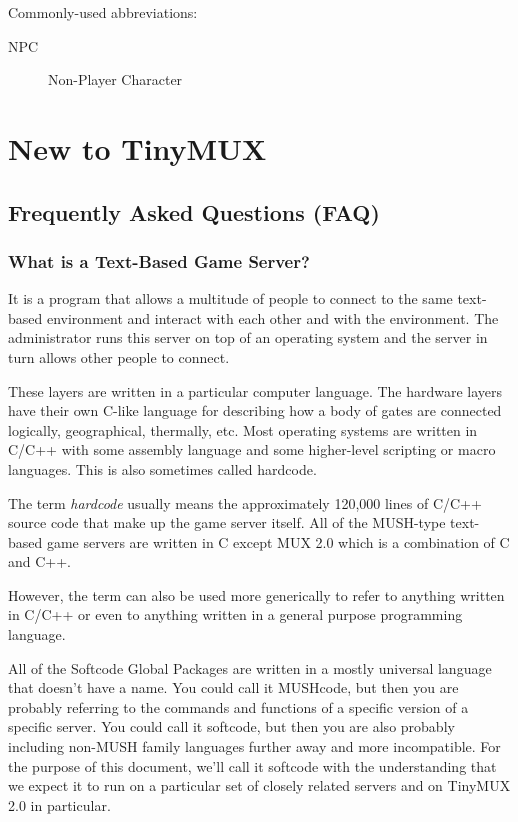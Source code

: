 \documentclass[dvips]{book}
\begin{document}
Commonly-used abbreviations:

\begin{description}
\item[NPC] Non-Player Character

\end{description}

\chapter{New to TinyMUX}
\section{Frequently Asked Questions (FAQ)}
\subsection{What is a Text-Based Game Server?}
It is a program that allows a multitude of people to connect to the same
text-based environment and interact with each other and with the environment.
The administrator runs this server on top of an operating system and the server
in turn allows other people to connect. %

These layers are written in a particular computer language. The hardware
layers have their own C-like language for describing how a body of gates are
connected logically, geographical, thermally, etc.  Most operating systems are
written in C/C++ with some assembly language and some higher-level scripting
or macro languages. This is also sometimes called hardcode.

The term \emph{hardcode} usually means the approximately 120,000 lines of C/C++
source code that make up the game server itself.
All of the MUSH-type text-based game servers are written in C except MUX 2.0
which is a combination of C and C++.

However, the term can also be used more generically to refer to anything
written in C/C++ or even to anything written in a general purpose programming
language.

All of the Softcode Global Packages are written in a mostly universal language
that doesn't have a name. You could call it MUSHcode, but then you are probably
referring to the commands and functions of a specific version of a specific
server. You could call
it softcode, but then you are also probably including non-MUSH family languages
further away and more incompatible. For the purpose of this document, we'll
call it softcode with the understanding that we expect it to run on a particular
set of closely related servers and on TinyMUX 2.0 in particular.
\end{document}
